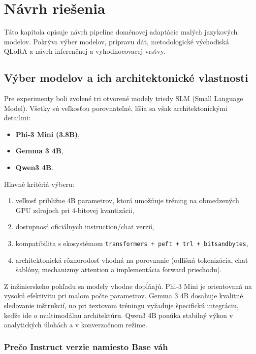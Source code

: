 
\chapter{Návrh riešenia}
\label{ch:navrh-riesenia}

Táto kapitola opisuje návrh pipeline doménovej adaptácie malých jazykových modelov. Pokrýva výber modelov, prípravu dát, metodologické východiská QLoRA a návrh inferenčnej a vyhodnocovacej vrstvy.

\section{Výber modelov a ich architektonické vlastnosti}

Pre experimenty boli zvolené tri otvorené modely triedy SLM (Small Language Model). Všetky sú veľkosťou porovnateľné, líšia sa však architektonickými detailmi:

\begin{itemize}
    \item \textbf{Phi-3 Mini (3.8B)},
    \item \textbf{Gemma 3 4B},
    \item \textbf{Qwen3 4B}.
\end{itemize}

Hlavné kritériá výberu:
\begin{enumerate}
    \item veľkosť približne 4B parametrov, ktorá umožňuje tréning na obmedzených GPU zdrojoch pri 4-bitovej kvantizácii,
    \item dostupnosť oficiálnych instruction/chat verzií,
    \item kompatibilita s ekosystémom \texttt{transformers + peft + trl + bitsandbytes},
    \item architektonická rôznorodosť vhodná na porovnanie (odlišná tokenizácia, chat šablóny, mechanizmy attention a implementácia forward priechodu).
\end{enumerate}

Z inžinierskeho pohľadu sa modely vhodne dopĺňajú. Phi-3 Mini je orientovaná na vysokú efektivitu pri malom počte parametrov. Gemma 3 4B dosahuje kvalitné sledovanie inštrukcií, no pri textovom tréningu vyžaduje špecifickú integráciu, keďže ide o multimodálnu architektúru. Qwen3 4B ponúka stabilný výkon v analytických úlohách a v konverzačnom režime.

\subsection{Prečo Instruct verzie namiesto Base váh}

